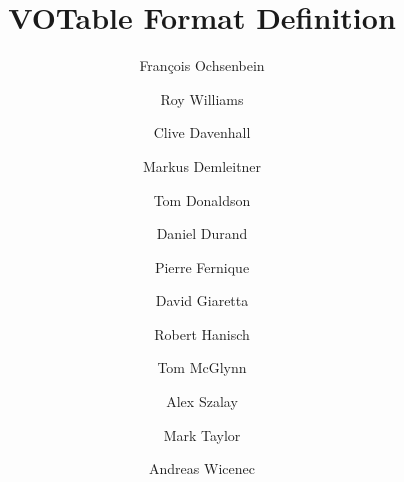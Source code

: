 \documentclass[11pt,a4paper]{ivoa}
\begin{document}
\newenvironment{TABULAR}[2]{\begin{tabular}{#2}}{\end{tabular}}
\newenvironment{plain}{\begin{quote}}{\end{quote}}
\fi


\title{VOTable Format Definition}


\author[http://www.ivoa.net/twiki/bin/view/IVOA/FrancoisOchsenbein]
                                               {Fran\c{c}ois Ochsenbein}
\author[http://www.ivoa.net/twiki/bin/view/IVOA/RoyWilliams]{Roy Williams}
\author[http://www.ivoa.net/twiki/bin/view/IVOA/CliveDavenhall]{Clive Davenhall}
\author[http://www.ivoa.net/twiki/bin/view/IVOA/MarkusDemleitner]
                                               {Markus Demleitner}
\author[http://www.ivoa.net/twiki/bin/view/IVOA/TomDonaldson]{Tom Donaldson}
\author[http://www.ivoa.net/twiki/bin/view/IVOA/DanielDurand]{Daniel Durand}
\author[http://www.ivoa.net/twiki/bin/view/IVOA/PierreFernique]{Pierre Fernique}
\author[http://www.ivoa.net/twiki/bin/view/IVOA/DavidGiaretta]{David Giaretta}
\author[http://www.ivoa.net/twiki/bin/view/IVOA/BobHanisch]{Robert Hanisch}
\author[http://www.ivoa.net/twiki/bin/view/IVOA/TomMcGlynn]{Tom McGlynn}
\author[http://www.ivoa.net/twiki/bin/view/IVOA/AlexSzalay]{Alex Szalay}
\author[http://www.ivoa.net/twiki/bin/view/IVOA/MarkTaylor]{Mark Taylor}
\author[http://www.ivoa.net/twiki/bin/view/IVOA/AndreasWicenec]{Andreas Wicenec}


\end{document}
